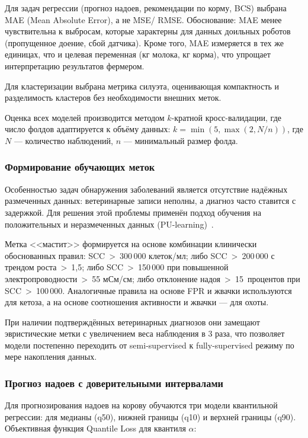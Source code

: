 Для задач регрессии (прогноз надоев, рекомендации по корму, BCS) выбрана MAE (Mean Absolute Error), а не MSE/ RMSE. Обоснование: MAE менее чувствительна к выбросам, которые характерны для данных доильных роботов (пропущенное доение, сбой датчика). Кроме того, MAE измеряется в тех же единицах, что и целевая переменная (кг молока, кг корма), что упрощает интерпретацию результатов фермером.

Для кластеризации выбрана метрика силуэта, оценивающая компактность и разделимость кластеров без необходимости внешних меток.

Оценка всех моделей производится методом $k$-кратной кросс-валидации, где число фолдов адаптируется к объёму данных: $k = \min(5, \max(2, N / n))$, где $N$ --- количество наблюдений, $n$ --- минимальный размер фолда.

\subsubsection{Формирование обучающих меток}

Особенностью задач обнаружения заболеваний является отсутствие надёжных размеченных данных: ветеринарные записи неполны, а диагноз часто ставится с задержкой. Для решения этой проблемы применён подход обучения на положительных и неразмеченных данных (PU-learning)~\cite{PULearning}.

Метка <<мастит>> формируется на основе комбинации клинически обоснованных правил: SCC~>~300\,000 клеток/мл; либо SCC~>~200\,000 с трендом роста~>~1,5; либо SCC~>~150\,000 при повышенной электропроводности~>~55 мСм/см; либо отклонение надоя~>~15~процентов при SCC~>~100\,000. Аналогичные правила на основе FPR и жвачки используются для кетоза, а на основе соотношения активности и жвачки --- для охоты.

При наличии подтверждённых ветеринарных диагнозов они замещают эвристические метки с увеличением веса наблюдения в 3 раза, что позволяет модели постепенно переходить от semi-supervised к fully-supervised режиму по мере накопления данных.

\subsubsection{Прогноз надоев с доверительными интервалами}

Для прогнозирования надоев на корову обучаются три модели квантильной регрессии: для медианы (q50), нижней границы (q10) и верхней границы (q90). Объективная функция Quantile Loss для квантиля $\alpha$:

